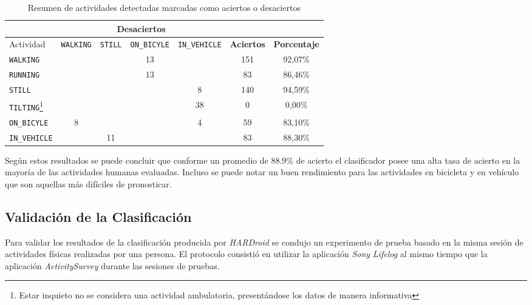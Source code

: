 \begin{table}[h]
\begin{centering}
\begin{tabular}{|l|c|c|c|c|c|c|}
\cline{2-5} 
\multicolumn{1}{l|}{} & \multicolumn{4}{c|}{\textbf{Desaciertos}} & \multicolumn{1}{c}{} & \multicolumn{1}{c}{}\tabularnewline
\hline 
Actividad & \texttt{\footnotesize{}WALKING} & \texttt{\footnotesize{}STILL} & \texttt{\footnotesize{}ON\_BICYLE} & \texttt{\footnotesize{}IN\_VEHICLE} & \textbf{\small{}Aciertos} & \textbf{\small{}Porcentaje}\tabularnewline
\hline 
\hline 
\texttt{\footnotesize{}WALKING} &  &  & 13 &  & 151 & 92,07\%\tabularnewline
\hline 
\texttt{\footnotesize{}RUNNING} &  &  & 13 &  & 83 & 86,46\%\tabularnewline
\hline 
\texttt{\footnotesize{}STILL} &  &  &  & 8 & 140 & 94,59\%\tabularnewline
\hline 
\texttt{\footnotesize{}TILTING}\emph{\footnotesize{}}\footnote{{\footnotesize{}Estar inquieto no se considera una actividad ambulatoria,
presentándose los datos de manera informativa}} &  &  &  & 38 & 0 & 0,00\%\tabularnewline
\hline 
\texttt{\footnotesize{}ON\_BICYLE} & 8 &  &  & 4 & 59 & 83,10\%\tabularnewline
\hline 
\texttt{\footnotesize{}IN\_VEHICLE} &  & 11 &  &  & 83 & 88,30\%\tabularnewline
\hline 
\end{tabular}
\par\end{centering}
\caption[Aciertos y desaciertos de actividades humanas detectadas]{\label{tab6:vencuesta}Resumen de actividades detectadas marcadas
como aciertos o desaciertos}
\end{table}

Según estos resultados se puede concluir que conforme un promedio
de $88.9$\% de acierto el clasificador posee una alta tasa de acierto
en la mayoría de las actividades humanas evaluadas. Incluso se puede
notar un buen rendimiento para las actividades en bicicleta y en vehículo
que son aquellas más difíciles de pronosticar.

\subsection{Validación de la Clasificación}

Para validar los resultados de la clasificación producida por \emph{HARDroid
}se condujo un experimento de prueba basado en la misma sesión de
actividades físicas realizadas por una persona. El protocolo consistió
en utilizar la aplicación \emph{Sony} \emph{Lifelog} al mismo tiempo
que la aplicación \emph{ActivitySurvey} durante las sesiones de pruebas. 


